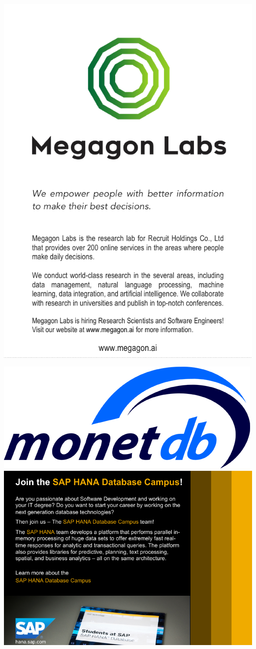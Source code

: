 \includegraphics[keepaspectratio,width=.4\textheight,height=\textwidth]{ads/megagon-cropped.pdf}

\pagebreak

\includegraphics[height=.49\textheight,width=\textwidth,keepaspectratio]{ads/monetdb.png}
\vfill
\includegraphics[height=.49\textheight,width=\textwidth,keepaspectratio]{ads/sap.pdf}
\pagebreak

